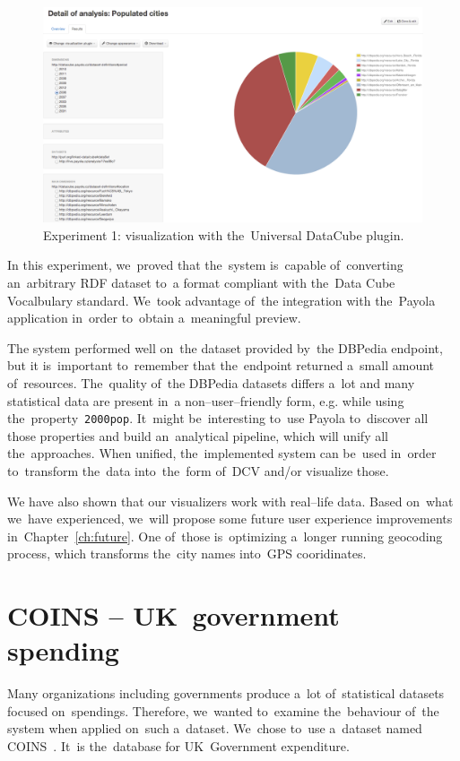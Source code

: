 \begin{figure}
  \centering
  \includegraphics[width=140mm]{img/payola-exp-01-vis2.png}
  \caption{Experiment 1: visualization with the~Universal DataCube plugin.}
  \label{fig:payola-exp-01-vis2}
\end{figure}

In this experiment, we~proved that the~system is~capable of~converting an~arbitrary RDF dataset to~a format compliant with the~Data Cube Vocalbulary 
standard. We~took advantage of~the integration with the~Payola application in~order to~obtain a~meaningful preview.

The system performed well on~the dataset provided by~the DBPedia endpoint, but 
it is~important to~remember that the~endpoint returned a~small amount of~resources. The~quality of~the DBPedia datasets differs a~lot and many 
statistical data are present in~a non--user--friendly form, e.g. while using the~property~\texttt{2000pop}. It~might be~interesting to~use Payola to~discover 
all those properties and build an~analytical pipeline, which will unify all the~approaches. When unified, the~implemented system can be~used in~order to~transform the~data into~the~form of~DCV and/or visualize those.

We have also shown that our visualizers work with real--life data. Based on~what we~have experienced, we~will propose some future user experience 
improvements in~Chapter~\ref{ch:future}. One of~those is~optimizing a~longer running 
geocoding process, which transforms the~city names into~GPS cooridinates.

\section{COINS -- UK~government spending}
Many organizations including governments produce a~lot of~statistical datasets 
focused on~spendings. Therefore, we~wanted to~examine the~behaviour of~the 
system when applied on~such a~dataset. We~chose to~use a~dataset named 
COINS~\cite{coins}. It~is the~database for UK~Government expenditure.


